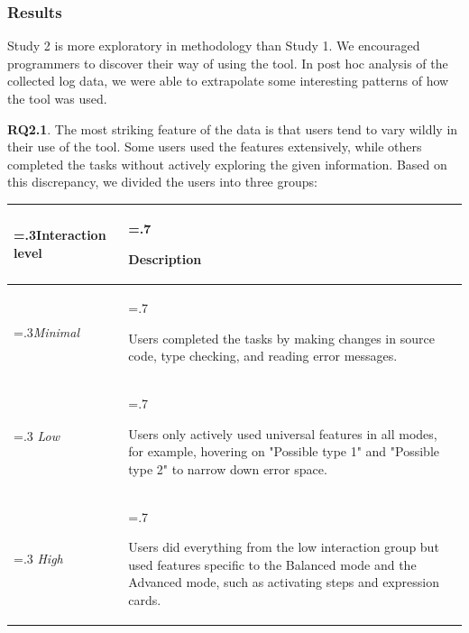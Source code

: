 \subsubsection*{\textbf{Results}} 

Study 2 is more exploratory in methodology than Study 1. We encouraged programmers  to discover their way of using the tool. In post hoc analysis of the collected log data, we were able to extrapolate some interesting patterns of how the tool was used. 


\textbf{RQ2.1}. The most striking feature of the data is that users tend to vary wildly in their use of the tool. Some users used the features extensively, while others completed the tasks without actively exploring the given information. Based on this discrepancy, we divided the users into three groups:

\begin{small}
\noindent\begin{tabularx}{\linewidth}{ 
  | >{\hsize=.3\hsize}X 
  | >{\hsize=.7\hsize \raggedright\arraybackslash}X  | }

    \hline
        Interaction level & Description \\ \hline
        \textit{Minimal}  & Users completed the tasks by making changes in source code, type checking, and reading error messages. \\ \hline
        \textit{Low}  & Users only actively used universal features in all modes, for example, hovering on "Possible type 1" and "Possible type 2" to narrow down error space. \\ \hline
        \textit{High}  & Users did everything from the low interaction group but used features specific to the Balanced mode and the Advanced mode, such as activating steps and expression cards. \\ \hline
\end{tabularx}
\end{small}


